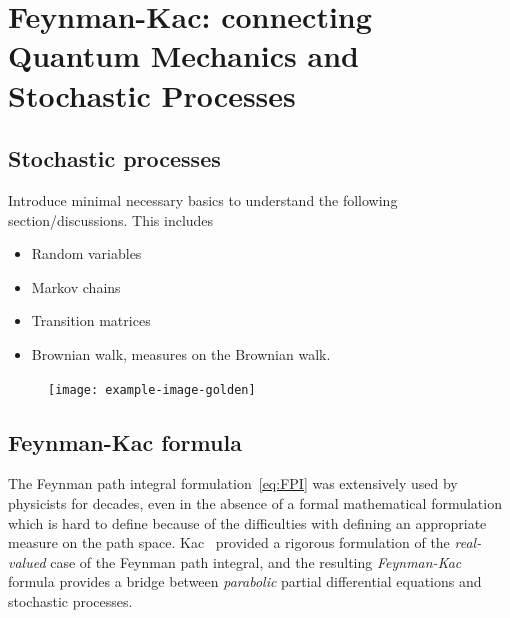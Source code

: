 
\newpage
\section[The Feynman-Kac formula]{Feynman-Kac: connecting Quantum Mechanics and Stochastic Processes}
\label{subsec:FK}

\subsection{Stochastic processes}
\label{subsec:fk-stoch}
Introduce minimal necessary basics to understand the following section/discussions. This includes
\begin{itemize}
	\item Random variables
	\item Markov chains
	\item Transition matrices
	\item Brownian walk, measures on the Brownian walk. 
\end{itemize}

\begin{figure}[h]
	\centering
	\texttt{[image: example-image-golden]}
\end{figure}

\subsection{Feynman-Kac formula}
\label{subsec:fk-fk}
The Feynman path integral formulation~\eqref{eq:FPI} was extensively used by physicists for decades, even in the absence of a formal mathematical formulation which is hard to define because of the difficulties with defining an appropriate measure on the path space. Kac~\cite{kac1949distributions} provided a rigorous formulation of the \textit{real-valued} case of the Feynman path integral, and the resulting \emph{Feynman-Kac} formula provides a bridge between \emph{parabolic} partial differential equations and stochastic processes.

